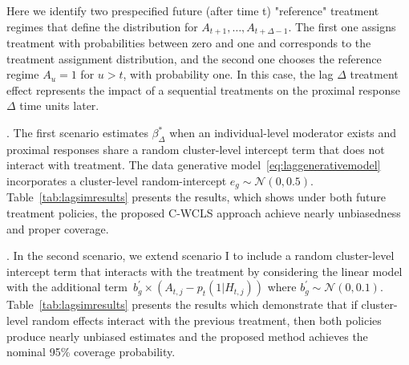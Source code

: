 \documentclass[supplementary, lineno]{biometrika}
\begin{document}
Here we identify two prespecified future (after time t) "reference" treatment regimes that define the distribution for $A_{t+1},\dots,A_{t+\Delta-1}$. The first one assigns treatment with probabilities between zero and one and corresponds to the treatment assignment distribution, and the second one chooses the reference regime $A_u = 1$ for $u>t$, with probability one. In this case, the lag $\Delta$ treatment effect represents the impact of a sequential treatments on the proximal response $\Delta$ time units later.  


. The first scenario estimates $\beta_\Delta^*$ when an individual-level moderator exists and proximal responses share a random cluster-level intercept term that does not interact with treatment. The data generative model~\eqref{eq:laggenerativemodel} incorporates a cluster-level random-intercept $e_g \sim \mathcal{N}(0,0.5)$.
Table~\ref{tab:lagsimresults} presents the results, which shows under both future treatment policies, the proposed C-WCLS approach achieve nearly unbiasedness and proper coverage. 



. In the second scenario, we extend scenario I to include a random cluster-level intercept term that interacts with the treatment by considering the linear model with the additional term~$b_g^\prime \times (A_{t,j} -p_{t}(1|H_{t,j}))$
where $b_g^\prime \sim \mathcal{N}(0,0.1)$.
Table~\ref{tab:lagsimresults} presents the results which demonstrate that if cluster-level random effects interact with the previous treatment, then both policies produce nearly unbiased estimates and the proposed method achieves the nominal 95\% coverage probability. 
\end{document}
